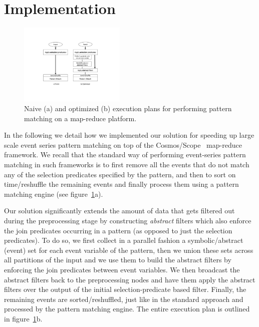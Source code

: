 \section{Implementation}

\begin{figure}[tp]
\centering
\includegraphics[clip, trim=5.6cm 4.5cm 6.3cm 4.2cm, 
width=0.45\textwidth]{graphs/query_plan.pdf}
\caption{Naive (a) and optimized (b) execution plans for performing pattern 
matching on a map-reduce platform.}
\label{fig:query_plan}
\end{figure}


In the following we detail how we implemented our solution for speeding up 
large scale event series pattern matching on top of the 
Cosmos/Scope~\cite{Chaiken:2008} map-reduce framework.
We recall that the standard way of performing event-series pattern matching in 
such frameworks is to first remove all the events that do not match any of the 
selection predicates specified by the pattern, and then to sort on 
time/reshuffle the remaining events and finally process them using a pattern 
matching engine (see figure~\ref{fig:query_plan}a).

Our solution significantly extends the amount of data that gets filtered out 
during the preprocessing stage by constructing {\em abstract} filters which 
also enforce the join predicates occurring in a pattern (as opposed to just the 
selection predicates).
To do so, we first collect in a parallel fashion a symbolic/abstract (event) 
set for each event variable of the pattern, then we union these sets across all 
partitions of the input and we use them to build the abstract filters by 
enforcing the join predicates between event variables. 
We then broadcast the abstract filters back to the preprocessing nodes and have 
them apply the abstract filters over the output of the initial 
selection-predicate based filter. 
Finally, the remaining events are sorted/reshuffled, just like in the standard 
approach and processed by the pattern matching engine. The entire execution 
plan is outlined in figure~\ref{fig:query_plan}b.



